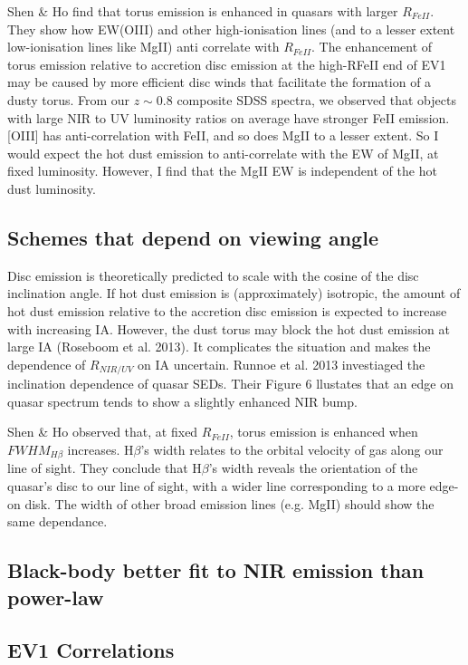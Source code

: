 Shen \& Ho find that torus emission is enhanced in quasars with larger $R_{FeII}$. 
They show how EW(OIII) and other high-ionisation lines (and to a lesser extent low-ionisation lines like MgII) anti correlate with $R_{FeII}$. 
The enhancement of torus emission relative to accretion disc emission at the high-RFeII end of EV1 may be caused by more efficient disc winds that facilitate the formation of a dusty torus. 
From our $z\sim0.8$ composite SDSS spectra, we observed that objects with large NIR to UV luminosity ratios on average have stronger FeII emission. 
[OIII] has anti-correlation with FeII, and so does MgII to a lesser extent. 
So I would expect the hot dust emission to anti-correlate with the EW of MgII, at fixed luminosity. 
However, I find that the MgII EW is independent of the hot dust luminosity. 

\subsection{Schemes that depend on viewing angle}

Disc emission is theoretically predicted to scale with the cosine of the disc inclination angle. 
If hot dust emission is (approximately) isotropic, the amount of hot dust emission relative to the accretion disc emission is expected to increase with increasing IA. 
However, the dust torus may block the hot dust emission at large IA (Roseboom et al. 2013). 
It complicates the situation and makes the dependence of $R_{NIR/UV}$ on IA uncertain. 
Runnoe et al. 2013 investiaged the inclination dependence of quasar SEDs. 
Their Figure 6 llustates that an edge on quasar spectrum tends to show a slightly enhanced NIR bump.

Shen \& Ho observed that, at fixed $R_{FeII}$, torus emission is enhanced when $FWHM_{H\beta}$ increases. 
H$\beta$’s width relates to the orbital velocity of gas along our line of sight. 
They conclude that H$\beta$'s width reveals the orientation of the quasar's disc to our line of sight, with a wider line corresponding to a more edge-on disk. 
The width of other broad emission lines (e.g. MgII) should show the same dependance.   
   
\subsection{Black-body better fit to NIR emission than power-law}

\subsection{EV1 Correlations}

